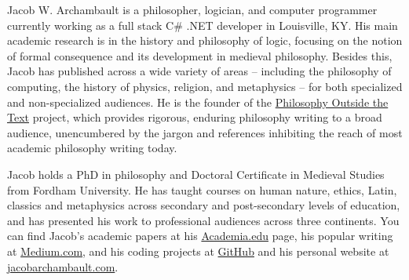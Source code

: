 \documentclass[]{article}
\begin{document}
Jacob W. Archambault is a philosopher, logician, and computer programmer currently working as a full stack C\# .NET developer in Louisville, KY. His main academic research is in the history and philosophy of logic, focusing on the notion of formal consequence and its development in medieval philosophy. Besides this, Jacob has published across a wide variety of areas – including the philosophy of computing, the history of physics, religion, and metaphysics – for both specialized and non-specialized audiences. He is the founder of the \href{https://medium.com/philosophy-outside-the-text}{Philosophy Outside the Text} project, which provides rigorous, enduring philosophy writing to a broad audience, unencumbered by the jargon and references inhibiting the reach of most academic philosophy writing today. 

Jacob holds a PhD in philosophy and Doctoral Certificate in Medieval Studies from Fordham University. He has taught courses on human nature, ethics, Latin, classics and metaphysics across secondary and post-secondary levels of education, and has presented his work to professional audiences across three continents.
You can find Jacob’s academic papers at his \href{https://fordham.academia.edu/JacobArchambault}{Academia.edu} page, his popular writing at \href{https://medium.com/@jacobarchambault}{Medium.com}, and his coding projects at \href{https://github.com/JacobArchambault}{GitHub} and his personal website at \href{https://jacobarchambault.com}{jacobarchambault.com}.
\end{document}
